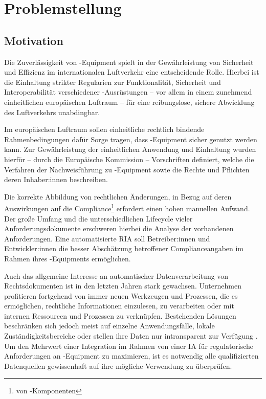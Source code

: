 \chapter{Problemstellung}

\section{Motivation}
    
    Die Zuverlässigkeit von \atmans-Equipment spielt in der Gewährleistung von Sicherheit und Effizienz im internationalen Luftverkehr eine entscheidende Rolle. 
    Hierbei ist die Einhaltung strikter Regularien zur Funktionalität, Sicherheit und Interoperabilität verschiedener \atmans-Ausrüstungen -- vor allem in einem zunehmend einheitlichen europäischen Luftraum -- für eine reibungslose, sichere Abwicklung des Luftverkehrs unabdingbar. 

    \medskip
    Im europäischen Luftraum sollen einheitliche rechtlich bindende Rahmenbedingungen dafür Sorge tragen, dass \atmans-Equipment sicher genutzt werden kann.
    Zur Gewährleistung der einheitlichen Anwendung und Einhaltung wurden hierfür -- durch die Europäische Kommission -- Vorschriften definiert, welche die Verfahren der Nachweisführung zu \atmans{}-Equip\-ment sowie die Rechte und Pflichten deren Inhaber:innen beschreiben. \cite[Art. 43]{2018R1139} 
        
    \medskip
    Die korrekte Abbildung von rechtlichen Änderungen, in Bezug auf deren Auswirkungen auf die Compliance\footnote{von \atmans{}-Komponenten} erfordert einen hohen manuellen Aufwand.
    Der große Umfang und die unterschiedlichen Lifecycle vieler Anforderungsdokumente erschweren hierbei die Analyse der vorhandenen Anforderungen.
    Eine automatisierte \ac{RIA} soll Betreiber:innen und Entwickler:innen die besser Abschätzung betroffener Complianceangaben im Rahmen ihres \atmans-Equipments ermöglichen.

    \medskip
    Auch das allgemeine Interesse an automatischer Datenverarbeitung von Rechtsdokumenten ist in den letzten Jahren stark gewachsen.
    Unternehmen profitieren fortgehend von immer neuen Werkzeugen und Prozessen, die es ermöglichen, rechtliche Informationen einzulesen, zu verarbeiten oder mit internen Ressourcen und Prozessen zu verknüpfen.
    Bestehenden Lösungen beschränken sich jedoch meist auf einzelne Anwendungsfälle, lokale Zuständigkeitsbereiche oder stellen ihre Daten nur intransparent zur Verfügung \cite[385]{eu_open_legal_info}. 
    Um den Mehrwert einer Integration im Rahmen von einer \ac{IA} für regulatorische Anforderungen an \atmans-Equipment zu maximieren, ist es notwendig alle qualifizierten Datenquellen gewissenhaft auf ihre mögliche Verwendung zu überprüfen. 
        
